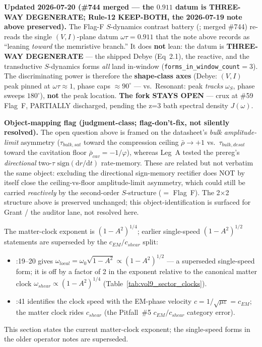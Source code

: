 \medskip\noindent
\textbf{Updated 2026-07-20 (\#744 merged --- the $0.911$ datum is THREE-WAY DEGENERATE; Rule-12 KEEP-BOTH, the 2026-07-19 note above preserved).} The Flag-F $S$-dynamics contrast battery (; merged \#744) re-reads the single $(V,I)$-plane datum $\omega\tau=0.911$ that the note above records as ``leaning \emph{toward} the memristive branch.'' It does \textbf{not} lean: the datum is \textbf{THREE-WAY DEGENERATE} --- the shipped Debye (Eq~2.1), the reactive, and the transductive $S$-dynamics forms \emph{all} land in-window (\texttt{forms\_in\_window\_count}$=3$). The discriminating power is therefore the \textbf{shape-class axes} (Debye: $(V,I)$ peak pinned at $\omega\tau\approx1$, phase caps $\approx90^\circ$ --- vs.\ Resonant: peak \emph{tracks} $\omega_S$, phase sweeps $180^\circ$), \textbf{not} the peak location. \textbf{The fork STAYS OPEN} --- crux at \#59 Flag~F, PARTIALLY discharged, pending the z=3 bath spectral density $J(\omega)$.

\noindent
\textbf{Object-mapping flag (judgment-class; flag-don't-fix, not silently resolved).} The open question above is framed on the datasheet's \emph{bulk amplitude-limit} asymmetry ($\tau_{bulk,sat}$ toward the compression ceiling $\bar{\rho}\to+1$ vs.\ $\tau_{bulk,desat}$ toward the cavitation floor $\bar{\rho}_{cav}=-1/\varphi$), whereas Leg~A tested the prereg's \emph{directional} two-$\tau$ $\mathrm{sign}(\mathrm{d}r/\mathrm{d}t)$ rate-memory. These are related but not verbatim the same object: excluding the directional sign-memory rectifier does NOT by itself close the ceiling-vs-floor amplitude-limit asymmetry, which could still be carried \emph{reactively} by the second-order $S$-structure ($=$ Flag~F). The 2$\times$2 structure above is preserved unchanged; this object-identification is surfaced for Grant / the auditor lane, not resolved here.

\begin{warningbox}
The matter-clock exponent is $(1-A^2)^{1/4}$; earlier single-speed $(1-A^2)^{1/2}$ statements are superseded by the $c_{EM}/c_{shear}$ split:
\begin{itemize}
    \item {}:19--20 gives $\omega_{local} = \omega_0\sqrt{1-A^2} \propto (1-A^2)^{1/2}$ --- a superseded single-speed form; it is off by a factor of 2 in the exponent relative to the canonical matter clock $\omega_{shear} \propto (1-A^2)^{1/4}$ (Table~\ref{tab:vol9_sector_clocks}).
    \item {}:41 identifies the clock speed with the EM-phase velocity $c = 1/\sqrt{\mu\varepsilon} = c_{EM}$; the matter clock rides $c_{shear}$ (the Pitfall~\#5 $c_{EM}/c_{shear}$ category error).
\end{itemize}
This section states the current matter-clock exponent; the single-speed forms in the older operator notes are superseded.
\end{warningbox}

